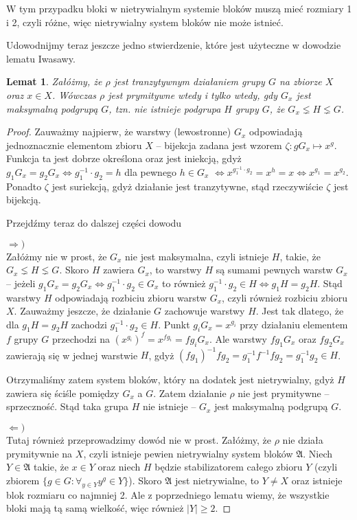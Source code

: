 \documentclass[licencjacka]{pracamgr}
\newtheorem{lemma}{Lemat}[section]
\begin{document}
W tym przypadku bloki w nietrywialnym systemie bloków muszą mieć rozmiary 1 i 2,
czyli różne, więc nietrywialny system bloków nie może istnieć.

Udowodnijmy teraz jeszcze jedno stwierdzenie, które jest użyteczne w dowodzie lematu Iwasawy.

\begin{lemma}\label{max_group}
	Załóżmy, że $\rho$ jest tranzytywnym działaniem grupy $G$ na zbiorze $X$ oraz $x \in X$.
	Wówczas $\rho$ jest prymitywne wtedy i tylko wtedy, gdy $G_x$ jest maksymalną podgrupą $G$, tzn.
	nie istnieje podgrupa $H$ grupy $G$, że $G_x \lneq H \lneq G$.
\end{lemma}
\begin{proof}
Zauważmy najpierw, że warstwy (lewostronne) $G_x$ odpowiadają jednoznacznie elementom zbioru $X$ --
bijekcja zadana jest wzorem $\zeta \colon g G_x \mapsto x^g$.
Funkcja ta jest dobrze określona oraz jest iniekcją, gdyż $g_1 G_x = g_2 G_x \iff g_1^{-1} \cdot g_2 = h$ dla pewnego $h \in G_x$
$\iff x^{g_1^{-1} \cdot g_2} = x^h = x \iff x^{g_1} = x^{g_2}$.
Ponadto $\zeta$ jest suriekcją, gdyż działanie jest tranzytywne, stąd rzeczywiście $\zeta$ jest bijekcją.

Przejdźmy teraz do dalszej części dowodu

$\Rightarrow)$ \\
Załóżmy nie w prost, że $G_x$ nie jest maksymalna, czyli istnieje $H$, takie, że $G_x \lneq H \lneq G$.
Skoro $H$ zawiera $G_x$, to warstwy $H$ są sumami pewnych warstw $G_x$ -- 
jeżeli $g_1 G_x = g_2 G_x \iff g_1^{-1} \cdot g_2 \in G_x$ to również $g_1^{-1} \cdot g_2 \in H \iff g_1 H = g_2 H$.
Stąd warstwy $H$ odpowiadają rozbiciu zbioru warstw $G_x$, czyli również rozbiciu zbioru $X$.
Zauważmy jeszcze, że działanie $G$ zachowuje warstwy $H$.
Jest tak dlatego, że dla $g_1 H = g_2 H$ zachodzi $g_1^{-1} \cdot g_2 \in H$.
Punkt $g_i G_x = x^{g_i}$ przy działaniu elementem $f$ grupy $G$ przechodzi na $(x^{g_i})^f = x^{f g_i} = f g_i G_x$.
Ale warstwy $f g_1 G_x$ oraz $f g_2 G_x$ zawierają się w jednej warstwie $H$, gdyż $(f g_1)^{-1} f g_2 = g_1^{-1} f^{-1} f g_2 = g_1^{-1} g_2 \in H$.

Otrzymaliśmy zatem system bloków, który na dodatek jest nietrywialny, gdyż $H$ zawiera się ściśle pomiędzy $G_x$ a $G$.
Zatem działanie $\rho$ nie jest prymitywne -- sprzeczność.
Stąd taka grupa $H$ nie istnieje -- $G_x$ jest maksymalną podgrupą $G$.

$\Leftarrow)$ \\
Tutaj również przeprowadzimy dowód nie w prost.
Załóżmy, że $\rho$ nie działa prymitywnie na $X$, czyli istnieje pewien nietrywialny system bloków $\mathfrak{A}$.
Niech $Y \in \mathfrak{A}$ takie, że $x \in Y$ oraz niech $H$ będzie stabilizatorem całego zbioru $Y$
(czyli zbiorem $\{g \in G \colon \forall_{y \in Y} y^g \in Y \}$).
Skoro $\mathfrak{A}$ jest nietrywialne, to $Y \ne X$ oraz istnieje blok rozmiaru co najmniej 2.
Ale z poprzedniego lematu wiemy, że wszystkie bloki mają tą samą wielkość, więc również $|Y| \ge 2$.


\end{proof}
\end{document}
